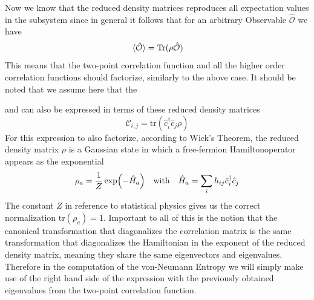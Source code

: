 \documentclass[11pt, a4paper]{article}
\theoremstyle{definition} %
\begin{document}
	Now we know that the reduced density matrices reproduces all expectation values in the subsystem since in general it follows that for an arbitrary Observable $\hat{\mathcal{O}}$ we have
	\begin{equation}
		\expval*{\hat{\mathcal{O}}} = \text{Tr}(\rho \hat{\mathcal{O}})
	\end{equation}
	This means that the two-point correlation function and all the higher order correlation functions should factorize, similarly to the above case. It should be noted that we assume here that the 

	
	and can also be expressed in terms of these reduced density matrices
	\begin{equation}
		\mathcal{C}_{i,j} = \text{tr}(\hat{c}_i^\dagger \hat{c}_j \rho)
	\end{equation}
	For this expression to also factorize, according to Wick's Theorem, the reduced density matrix $\rho$ is a Gaussian state in which a free-fermion Hamiltonoperator appears as the exponential
	\begin{equation}
		\rho_a = \frac{1}{Z} \exp(- \hat{H}_a) \qq{with} \hat{H}_a = \sum_i h_{ij} \hat{c}_i^\dagger \hat{c}_j
	\end{equation}
	The constant $Z$ in reference to statistical physics gives us the correct normalization $\text{tr}(\rho_a) = 1$. Important to all of this is the notion that the canonical transformation that diagonalizes the correlation matrix is the same transformation that diagonalizes the Hamiltonian in the exponent of the reduced density matrix, meaning they share the same eigenvectors and eigenvalues. Therefore in the computation of the von-Neumann Entropy we will simply make use of the right hand side of the expression with the previously obtained eigenvalues from the two-point correlation function.
	
\end{document}
